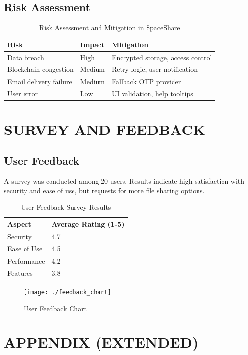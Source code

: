 \documentclass[a4paper, 12pt]{report}
\newenvironment{frontmatter}{}{}
\begin{document}
\begin{frontmatter}
\section{Risk Assessment}
\begin{longtable}{|p{}|p{}|p{}|}
\caption{Risk Assessment and Mitigation in SpaceShare} \\
\hline
\textbf{Risk} & \textbf{Impact} & \textbf{Mitigation} \\
\hline
Data breach & High & Encrypted storage, access control \\
\hline
Blockchain congestion & Medium & Retry logic, user notification \\
\hline
Email delivery failure & Medium & Fallback OTP provider \\
\hline
User error & Low & UI validation, help tooltips \\
\hline
\end{longtable}

\chapter{SURVEY AND FEEDBACK}
\section{User Feedback}
A survey was conducted among 20 users. Results indicate high satisfaction with security and ease of use, but requests for more file sharing options.

\begin{longtable}{|l|l|}
\caption{User Feedback Survey Results} \\
\hline
\textbf{Aspect} & \textbf{Average Rating (1-5)} \\
\hline
Security & 4.7 \\
\hline
Ease of Use & 4.5 \\
\hline
Performance & 4.2 \\
\hline
Features & 3.8 \\
\hline
\end{longtable}

\begin{figure}[H]
    \centering
    \texttt{[image: ./feedback\_chart]}
    \caption{User Feedback Chart}
\end{figure}

\chapter{APPENDIX (EXTENDED)}

\end{frontmatter}
\end{document}
